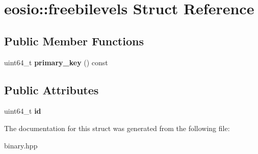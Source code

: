 \hypertarget{structeosio_1_1freebilevels}{}\section{eosio\+:\+:freebilevels Struct Reference}
\label{structeosio_1_1freebilevels}
\subsection*{Public Member Functions}
\begin{DoxyCompactItemize}
\item 
\mbox{\label{structeosio_1_1freebilevels_a6bda66273ef3bc02045549d25489ba9b}} 
uint64\+\_\+t {\bfseries primary\+\_\+key} () const
\end{DoxyCompactItemize}
\subsection*{Public Attributes}
\begin{DoxyCompactItemize}
\item 
\mbox{\label{structeosio_1_1freebilevels_ac1892fde8b17ab344e0e86719fa4d190}} 
uint64\+\_\+t {\bfseries id}
\end{DoxyCompactItemize}


The documentation for this struct was generated from the following file\+:\begin{DoxyCompactItemize}
\item 
binary.\+hpp\end{DoxyCompactItemize}
